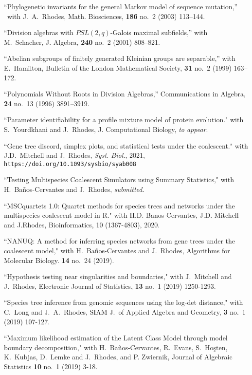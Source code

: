 \documentclass[10pt]{report}
\begin{document}
{{\begin{revnumerate}[44]
\item
``Phylogenetic invariants for the general Markov model of sequence
mutation,'' \ with J.~A.~Rhodes, Math. Biosciences, {\bf 186}
no.~2 (2003) 113--144.

\item
``Division algebras with $PSL(2,q)$-Galois maximal subfields,'' with
M.~Schacher, J. Algebra, {\bf 240} no.~2 (2001) 808--821.

\item
``Abelian subgroups of finitely generated Kleinian groups are
separable,'' with E.~Hamilton, Bulletin of the London
Mathematical Society, {\bf 31} no.~2 (1999) 163--172.

\item
``Polynomials Without Roots in Division Algebras,''
Communications in Algebra, {\bf 24} no.~13 (1996) 3891--3919.

\end{revnumerate}
}
{ 
``Parameter identifiability for a profile mixture model of protein evolution."
with S.~Yourdkhani and J.~Rhodes, J. Computational Biology, \emph{to appear}.

``Gene tree discord, simplex plots, and statistical tests under the coalescent."
with J.D.~Mitchell and J.~Rhodes,  \emph{Syst. Biol.}, 2021, 
{\tt https://doi.org/10.1093/sysbio/syab008}

``Testing Multispecies Coalescent Simulators using Summary Statistics,"
with H.~Ba\~nos-Cervantes and J.~Rhodes,
\emph{submitted}.

``MSCquartets 1.0: Quartet methods for species trees and networks under the multispecies coalescent model in R." 
with H.D. Banos-Cervantes, J.D. Mitchell and J.Rhodes,  Bioinformatics, 10 (1367-4803), 2020.  


``NANUQ: A method for inferring species networks
from gene trees under the coalescent model,"
 with H.~Ba\~nos-Cervantes and J.~Rhodes,
 Algorithms for Molecular Biology.
 {\bf 14} no.~24 (2019).
 
 ``Hypothesis testing near singularities and boundaries,"
 with J.~Mitchell and J.~Rhodes,
Electronic Journal of Statistics,
{\bf13} no.~1 (2019) 1250-1293.
 
 ``Species tree inference from genomic sequences using the log-det distance,"
 with C.~Long and J.~A.~Rhodes,
 SIAM J.~of Applied Algebra and Geometry,
 {\bf 3} no.~1 (2019) 107-127.

 ``Maximum likelihood estimation of the Latent Class Model through model boundary decomposition,"
 with H.~Ba\~{n}os-Cervantes, R.~Evans, S.~Ho\c{s}ten, K.~Kubjas, D.~Lemke and J.~Rhodes, and P. Zwiernik,
 Journal of Algebraic Statistics
{\bf 10} no.~1 (2019) 3-18. 
 
}}
\end{document}
